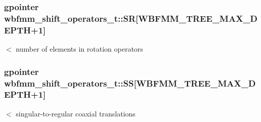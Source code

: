 \subsubsection[{S\+R}]{\setlength{\rightskip}{0pt plus 5cm}gpointer wbfmm\+\_\+shift\+\_\+operators\+\_\+t\+::\+S\+R[W\+B\+F\+M\+M\+\_\+\+T\+R\+E\+E\+\_\+\+M\+A\+X\+\_\+\+D\+E\+P\+T\+H+1]}\label{structwbfmm__shift__operators__t_ad2b175bb3009f69a1b9eee8155c479dc}
$<$ number of elements in rotation operators 
\subsubsection[{S\+S}]{\setlength{\rightskip}{0pt plus 5cm}gpointer wbfmm\+\_\+shift\+\_\+operators\+\_\+t\+::\+S\+S[W\+B\+F\+M\+M\+\_\+\+T\+R\+E\+E\+\_\+\+M\+A\+X\+\_\+\+D\+E\+P\+T\+H+1]}\label{structwbfmm__shift__operators__t_a60f777706a8e58b89a18976d8fcc02c9}
$<$ singular-\/to-\/regular coaxial translations 